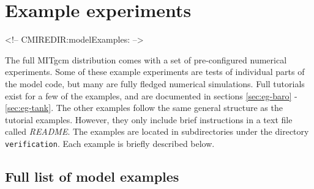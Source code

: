 
\section[MITgcm Example Experiments]{Example experiments}
\label{sec:modelExamples}
\begin{rawhtml}
<!-- CMIREDIR:modelExamples: -->
\end{rawhtml}


The full MITgcm distribution comes with a set of pre-configured
numerical experiments.  Some of these example experiments are tests of
individual parts of the model code, but many are fully fledged
numerical simulations. Full tutorials exist for a few of the examples,
and are documented in sections \ref{sec:eg-baro} -
\ref{sec:eg-tank}. The other examples follow the same general
structure as the tutorial examples. However, they only include brief
instructions in a text file called {\it README}.  The examples are
located in subdirectories under the directory \texttt{verification}.
Each example is briefly described below.

\subsection{Full list of model examples}

